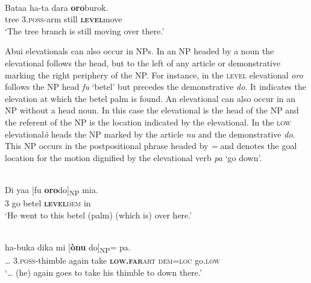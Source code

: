 \documentclass[output=paper]{LSP/langsci}
\begin{document}
 

\ea
{} \\
\gll Bataa   ha-ta{\ng} dara \textbf{oro}burok.  \\
tree  3.\textsc{poss}{}-arm   still  \textbf{\textsc{level}}move  \\
\glt   `The tree branch is still moving over there.'  
\z


 

  



Abui elevationals can also occur in NPs. In an NP headed by a noun the elevational follows the head, but to the left of any article or demonstrative marking the right periphery of the NP. For instance, in  the \textsc{level} elevational \textit{oro} follows the NP head \textit{fu} `betel' but precedes the demonstrative \textit{do}. It indicates the elevation at which the betel palm is found. An elevational can also occur in an NP without a head noun. In this case the elevational is the head of the NP and the referent of the NP is the location indicated by the elevational. In  the \textsc{low} elevational\textit {\`o} heads the NP marked by the article \textit{nu} and the demonstrative \textit{do}. This NP occurs in the postpositional phrase headed by \textit{={\ng}} and denotes the goal location for the motion dignified by the elevational verb \textit{pa} `go down'.



\ea%
\label{ex:7:11}
 \\
\gll Di  yaa  [fu \textbf{oro}do]\textsubscript{NP} mia. \\
  \textsc{3} go   betel  \textbf{\textsc{level}}\textsc{dem} in  \\
\glt   `He went to this betel (palm) (which is) over here.'  
\z

  

 



 

\ea%
\label{ex:7:12}
 \\
\gll {\dots} ha-buka{\ng} dika{\ng} mi     [\textbf{{\`o}nu}    do]\textsubscript{NP}={\ng}    pa. \\
  {\dots} 3.\textsc{poss}{}-thimble  again  take  \textbf{\textsc{low.far}}\textsc   {art  dem=loc} go.\textsc{low}  \\
\glt `{\dots} (he) again goes to take his thimble to down there.' 
\z
\end{document}
